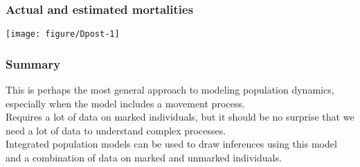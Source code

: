 \documentclass[color=usenames,dvipsnames]{beamer}\usepackage[]{graphicx}\usepackage[]{xcolor}
\begin{document}
\begin{frame}
  \frametitle{Actual and estimated mortalities}
  \begin{center}
    \texttt{[image: figure/Dpost-1]}
  \end{center}
\end{frame}








\begin{frame}
  \frametitle{Summary}
  This is perhaps the most general approach to modeling population
  dynamics, especially when the model includes a movement process. \\
  \pause \vfill
  Requires a lot of data on marked individuals, but it should be no
  surprise that we need a lot of data to understand complex
  processes. \\ 
  \pause \vfill
  Integrated population models can be used to draw inferences using
  this model and a combination of data on marked and unmarked
  individuals. \\ 
\end{frame}
\end{document}
